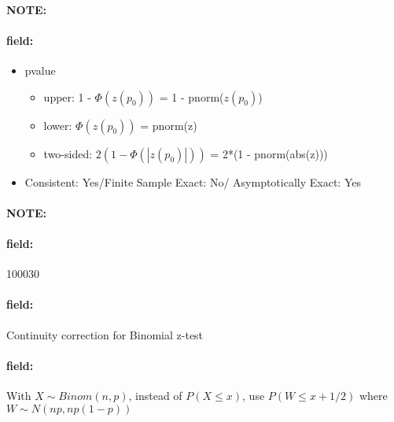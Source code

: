 \documentclass[12pt]{article}
\newenvironment{note}{\paragraph{NOTE:}}{}
\newenvironment{field}{\paragraph{field:}}{}
\begin{document}
\begin{note}
\begin{field}
\begin{itemize}
   \item pvalue
         \begin{itemize}
          \item upper: 1 - $\Phi(z(p_0))$ = 1 - pnorm($z(p_0)$)
          \item lower: $\Phi(z(p_0))$ = pnorm(z)
          \item two-sided: $2(1 - \Phi(|z(p_0)|))$ = 2*(1 - pnorm(abs(z)))
         \end{itemize}
   \item Consistent: Yes/Finite Sample Exact: No/ Asymptotically Exact: Yes
  \end{itemize}
 \end{field}
\end{note}

\begin{note} \begin{field} \tiny 100030 \end{field}
 \begin{field}
  Continuity correction for Binomial z-test
 \end{field}
 \begin{field}
  With $X \sim Binom(n,p)$, instead of $P(X \leq x)$, use $P(W \leq x + 1/2)$ where $W \sim N(np,np(1-p))$
 \end{field}
\end{note}
\end{document}
